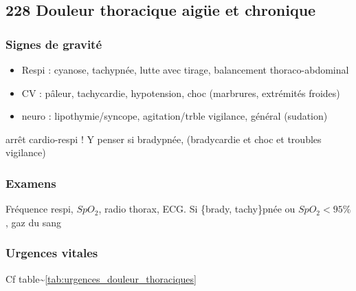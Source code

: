 \documentclass[11pt]{article}
\begin{document}
\subsection{228 \textdagger{} Douleur thoracique aigüe et chronique}
\label{sec:org1443bbb}
\label{sec:228_douleur_thoracique_aigue_et_chronique}

\subsubsection{Signes de gravité}
\label{sec:org63f8e83}

\begin{itemize}
\item Respi : cyanose, tachypnée, lutte avec tirage, balancement thoraco-abdominal
\item CV : pâleur, tachycardie, hypotension, choc (marbrures, extrémités
froides)
\item neuro : lipothymie/syncope, agitation/trble vigilance, général (sudation)
\end{itemize}


\danger arrêt cardio-respi ! Y penser si bradypnée, (bradycardie et choc et troubles vigilance)

\subsubsection{Examens}
\label{sec:org61bb6cc}
Fréquence respi, \(SpO_2\), radio thorax, ECG.
Si \{brady, tachy\}pnée ou \(SpO_2 < 95\%\), gaz du sang

\subsubsection{Urgences vitales}
\label{sec:org18f549a}
Cf table\textasciitilde{}\ref{tab:urgences_douleur_thoraciques}
\end{document}
